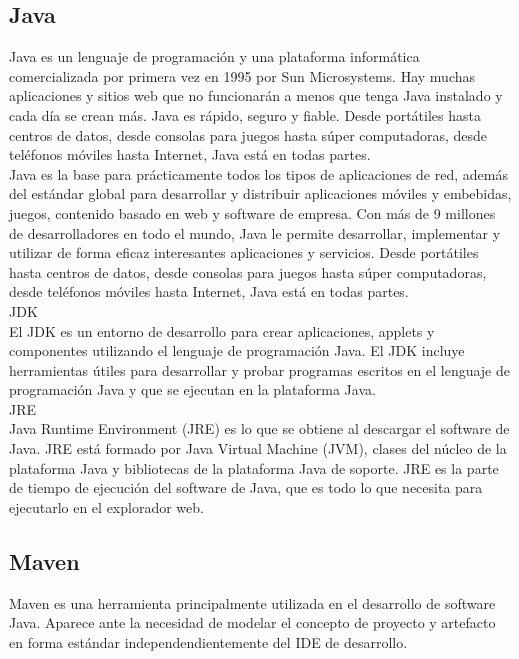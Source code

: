 \subsection{Java}
Java es un lenguaje de programación y una plataforma informática comercializada por primera vez en 1995 por Sun Microsystems. Hay muchas aplicaciones y sitios web que no funcionarán a menos que tenga Java instalado y cada día se crean más. Java es rápido, seguro y fiable. Desde portátiles hasta centros de datos, desde consolas para juegos hasta súper computadoras, desde teléfonos móviles hasta Internet, Java está en todas partes.\\

Java es la base para prácticamente todos los tipos de aplicaciones de red, además del estándar global para desarrollar y distribuir aplicaciones móviles y embebidas, juegos, contenido basado en web y software de empresa. Con más de 9 millones de desarrolladores en todo el mundo, Java le permite desarrollar, implementar y utilizar de forma eficaz interesantes aplicaciones y servicios. Desde portátiles hasta centros de datos, desde consolas para juegos hasta súper computadoras, desde teléfonos móviles hasta Internet, Java está en todas partes.\\

JDK\\

El JDK es un entorno de desarrollo para crear aplicaciones, applets y componentes utilizando el lenguaje de programación Java.
El JDK incluye herramientas útiles para desarrollar y probar programas escritos en el lenguaje de programación Java y que se ejecutan en la plataforma Java.\\

JRE\\

Java Runtime Environment (JRE) es lo que se obtiene al descargar el software de Java. JRE está formado por Java Virtual Machine (JVM), clases del núcleo de la plataforma Java y bibliotecas de la plataforma Java de soporte. JRE es la parte de tiempo de ejecución del software de Java, que es todo lo que necesita para ejecutarlo en el explorador web.\\
\subsection{Maven}
Maven es una herramienta principalmente utilizada en el desarrollo de software Java. Aparece ante la necesidad de modelar el concepto de proyecto  y artefacto en forma estándar independendientemente del IDE de desarrollo.\\


